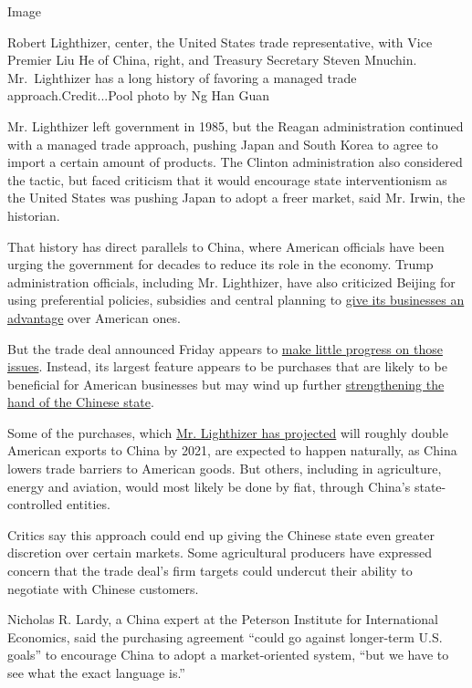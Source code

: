 Image

Robert Lighthizer, center, the United States trade representative, with
Vice Premier Liu He of China, right, and Treasury Secretary Steven
Mnuchin. Mr.~Lighthizer has a long history of favoring a managed trade
approach.Credit...Pool photo by Ng Han Guan

Mr. Lighthizer left government in 1985, but the Reagan administration
continued with a managed trade approach, pushing Japan and South Korea
to agree to import a certain amount of products. The Clinton
administration also considered the tactic, but faced criticism that it
would encourage state interventionism as the United States was pushing
Japan to adopt a freer market, said Mr. Irwin, the historian.

That history has direct parallels to China, where American officials
have been urging the government for decades to reduce its role in the
economy. Trump administration officials, including Mr. Lighthizer, have
also criticized Beijing for using preferential policies, subsidies and
central planning to
\href{https://www.nytimes.com/2019/05/12/business/china-trump-trade-subsidies.html}{give
its businesses an advantage} over American ones.

But the trade deal announced Friday appears to
\href{https://www.nytimes.com/2019/12/13/business/economy/china-trade-deal.html}{make
little progress on those issues}. Instead, its largest feature appears
to be purchases that are likely to be beneficial for American businesses
but may wind up further
\href{https://www.nytimes.com/2019/04/01/us/politics/us-china-trade-trump.html}{strengthening
the hand of the Chinese state}.

Some of the purchases, which
\href{https://www.nytimes.com/2019/12/15/business/economy/us-china-trade-deal.html}{Mr.
Lighthizer has projected} will roughly double American exports to China
by 2021, are expected to happen naturally, as China lowers trade
barriers to American goods. But others, including in agriculture, energy
and aviation, would most likely be done by fiat, through China's
state-controlled entities.

Critics say this approach could end up giving the Chinese state even
greater discretion over certain markets. Some agricultural producers
have expressed concern that the trade deal's firm targets could undercut
their ability to negotiate with Chinese customers.

Nicholas R. Lardy, a China expert at the Peterson Institute for
International Economics, said the purchasing agreement ``could go
against longer-term U.S. goals'' to encourage China to adopt a
market-oriented system, ``but we have to see what the exact language
is.''


